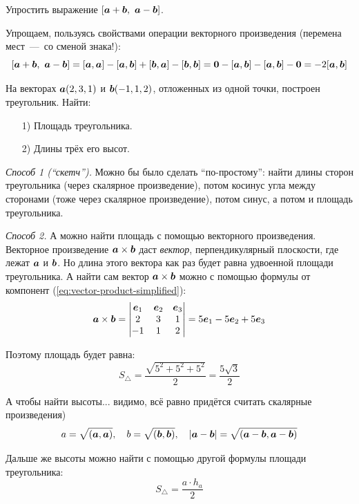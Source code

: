 \documentclass[a4paper,12pt]{article}
\begin{document}
  
  \begin{problem}[3.2(1)]
    Упростить выражение $[\bds a + \bds b,\ \bds a - \bds b]$.
  \end{problem}
  
  \begin{solution}
    Упрощаем, пользуясь свойствами операции векторного произведения (перемена мест~---~со сменой знака!):
    \[
      [\boldsymbol a + \boldsymbol b,\ \boldsymbol a - \boldsymbol b] = [\boldsymbol a, \boldsymbol a] - [\boldsymbol a, \boldsymbol b] + [\boldsymbol b, \boldsymbol a] - [\boldsymbol b, \boldsymbol b]
        = \boldsymbol 0 - [\boldsymbol a, \boldsymbol b] - [\boldsymbol a, \boldsymbol b] - \boldsymbol 0
        = -2 [\boldsymbol a, \boldsymbol b]
    \]
  \end{solution}
  
  
  \begin{problem}[3.8(1)]
    На векторах $\boldsymbol a(2, 3, 1)$ и $\boldsymbol b(-1, 1, 2)$, отложенных из одной точки, построен треугольник.
    Найти:
    \begin{itemize}
      \item[1)] Площадь треугольника.
      \item[2)] Длины трёх его высот.
    \end{itemize}
  \end{problem}
  
  \begin{solution}
    \leavevmode
    
    \emph{Способ 1 (``скетч'').}
    Можно бы было сделать ``по-простому'': найти длины сторон треугольника (через скалярное произведение), потом косинус угла между сторонами (тоже через скалярное произведение), потом синус, а потом и площадь треугольника.
    
    \medskip
    \emph{Способ 2.}
    А можно найти площадь с помощью векторного произведения.
    Векторное произведение $\bds a \hm\times \bds b$ даст \emph{вектор}, перпендикулярный плоскости, где лежат $\boldsymbol a$ и $\boldsymbol b$.
    Но длина этого вектора как раз будет равна удвоенной площади треугольника.
    А найти сам вектор $\bds a \hm\times \bds b$ можно с помощью формулы от компонент (\ref{eq:vector-product-simplified}):
    \[
      \boldsymbol a \times \boldsymbol b = \begin{vmatrix}
        \boldsymbol e_1 & \boldsymbol e_2 & \boldsymbol e_3\\
        2 & 3 & 1\\
        -1 & 1 & 2
      \end{vmatrix}
      = 5 \boldsymbol e_1 - 5 \boldsymbol e_2 + 5 \boldsymbol e_3
    \]
    
    Поэтому площадь будет равна:
    \[
      S_{\triangle} = \frac{\sqrt{5^2 + 5^2 + 5^2}}{2} = \frac{5 \sqrt{3}}{2}
    \]
    
    А чтобы найти высоты... видимо, всё равно придётся считать скалярные произведения)
    \[
      a = \sqrt{(\boldsymbol a, \boldsymbol a)}, \quad b = \sqrt{(\boldsymbol b, \boldsymbol b)}, \quad |\boldsymbol a - \boldsymbol b| = \sqrt{(\boldsymbol a - \boldsymbol b, \boldsymbol a - \boldsymbol b)}
    \]
    
    Дальше же высоты можно найти с помощью другой формулы площади треугольника:
    \[
      S_{\triangle} = \frac{a \cdot h_a}{2}
    \]
  \end{solution}
  
\end{document}

